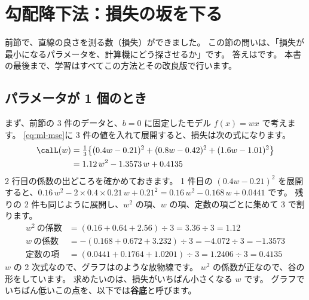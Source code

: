 \section{勾配降下法：損失の坂を下る}\label{sec:ml-gd}

前節で、直線の良さを測る数（損失）ができました。
この節の問いは、「損失が最小になるパラメータを、計算機にどう探させるか」です。
答えはです。
本書の最後まで、学習はすべてこの方法とその改良版で行います。

\subsection*{パラメータが 1 個のとき}

まず、前節の 3 件のデータと、$b=0$ に固定したモデル $f(x)=wx$ で考えます。
\eqref{eq:ml-mse}に 3 件の値を入れて展開すると、損失は次の式になります。
\begin{align}
\calL(w) &= \tfrac{1}{3}\bigl\{(0.4w-0.21)^2 + (0.8w-0.42)^2 + (1.6w-1.01)^2\bigr\} \notag\\
         &= 1.12\,w^2 - 1.3573\,w + 0.4135
\label{eq:ml-loss-1d}
\end{align}
2 行目の係数の出どころを確かめておきます。
1 件目の $(0.4w-0.21)^2$ を展開すると、$0.16\,w^2 - 2\times0.4\times0.21\,w + 0.21^2 = 0.16\,w^2 - 0.168\,w + 0.0441$ です。
残りの 2 件も同じように展開し、$w^2$ の項、$w$ の項、定数の項ごとに集めて 3 で割ります。
\begin{align*}
w^2\ \text{の係数} &= (0.16 + 0.64 + 2.56)\div 3 = 3.36\div 3 = 1.12\\
w\ \text{の係数} &= -(0.168 + 0.672 + 3.232)\div 3 = -4.072\div 3 = -1.3573\\
\text{定数の項} &= (0.0441 + 0.1764 + 1.0201)\div 3 = 1.2406\div 3 = 0.4135
\end{align*}
$w$ の 2 次式なので、グラフはのような放物線です。
$w^2$ の係数が正なので、谷の形をしています。
求めたいのは、損失がいちばん小さくなる $w$ です。
グラフでいちばん低いこの点を、以下では\textbf{谷底}と呼びます。

